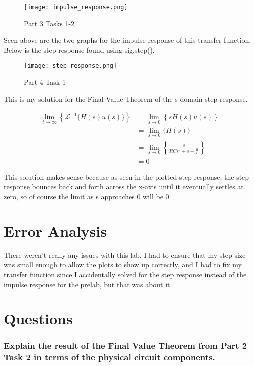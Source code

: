 \documentclass[12pt]{report}
\begin{document}
 \begin{figure}[H]
    \centering
    \texttt{[image: impulse\_response.png]}
    \caption{Part 3 Tasks 1-2}
\end{figure}

Seen above are the two graphs for the impulse response of this transfer function. Below is the step response found using sig.step().

\begin{figure}[H]
    \centering
    \texttt{[image: step\_response.png]}
    \caption{Part 4 Task 1}
\end{figure}

This is my solution for the Final Value Theorem of the s-domain step response.

\begin{align*}
    \lim_{t\to \infty} \left\{\mathcal{L}^{-1}\{H(s)u(s)\}\right\} &= 
    \lim_{s\to 0} \left\{sH(s)u(s)\right\} \\
    &= \lim_{s\to 0} \{H(s)\} \\
    &= \lim_{s\to 0} \left\{\frac{s}{RCs^2 + s + \frac{R}{L}}\right\} \\
    &= 0
\end{align*}

This solution makes sense because as seen in the plotted step response, the step response bounces back and forth across the x-axis until it eventually settles at zero, so of course the limit as s approaches 0 will be 0.
 
 \section{Error Analysis}
 
 There weren't really any issues with this lab. I had to ensure that my step size was small enough to allow the plots to show up correctly, and I had to fix my transfer function since I accidentally solved for the step response instead of the impulse response for the prelab, but that was about it.
 
 \section{Questions}
 \subsubsection{Explain the result of the Final Value Theorem from Part 2 Task 2 in terms of the physical circuit components.}
 
\end{document}
